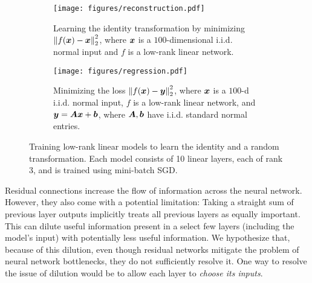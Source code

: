 \begin{figure*}[t!]
\centering
\begin{subfigure}[b]{0.46\textwidth}
    \centering
    \texttt{[image: figures/reconstruction.pdf]}
    \caption{Learning the identity transformation
    by minimizing $\left\|f(\bm{x}) - \bm{x}\right\|_2^2$, where
    $\bm{x}$ is a $100$-dimensional i.i.d. normal input and $f$ is a low-rank linear network.}
\end{subfigure}%
\hspace{0.25in} 
\begin{subfigure}[b]{0.46\textwidth}
    \centering
    \texttt{[image: figures/regression.pdf]}
    \caption{Minimizing the loss $\left\|f(\bm{x}) - \bm{y}\right\|_2^2$, where
    $\bm{x}$ is a $100$-d i.i.d. normal input, $f$ is a low-rank linear network, and $\bm{y} = {\bm{A}}\bm{x} + \bm{b}$, where
    ${\bm{A}}, \bm{b}$ have i.i.d. standard normal entries.}
\end{subfigure}
\caption{Training low-rank linear models to learn the identity and a random transformation. Each model consists of 
10 linear layers, each of rank 3, and is trained using mini-batch SGD.}\label{fig:linear_lowrank_experiments}
\end{figure*}

 Residual connections increase the
flow of information across the neural network. However,
they also come with a potential limitation:
Taking a straight sum of previous layer outputs
implicitly treats all previous layers as equally important. This can
dilute useful information present in a select few
layers (including the model's input) with potentially less useful
information. We hypothesize that, because of this dilution,
even though residual networks mitigate the problem of neural network bottlenecks, they do not sufficiently resolve it. 
One way to resolve the issue of dilution would be to allow
each layer to \emph{choose its inputs}.


